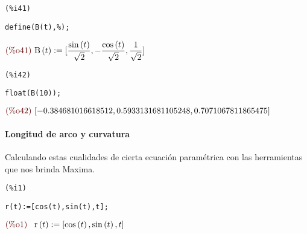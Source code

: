 \documentclass[12pt]{article}
\begin{document}
\noindent
\begin{minipage}[t]{8ex}{\color{red}\bf
\begin{verbatim}
(%i41) 
\end{verbatim}}
\end{minipage}
\begin{minipage}[t]{\textwidth}{\color{blue}
\begin{verbatim}
define(B(t),%);
\end{verbatim}}
\end{minipage}
\begin{math}\displaystyle
\parbox{8ex}{\color{labelcolor}(\%o41) }
\mathrm{B}\left( t\right) :=[\frac{\mathrm{sin}\left( t\right) }{\sqrt{2}},-\frac{\mathrm{cos}\left( t\right) }{\sqrt{2}},\frac{1}{\sqrt{2}}]
\end{math}

\noindent
\begin{minipage}[t]{8ex}{\color{red}\bf
\begin{verbatim}
(%i42) 
\end{verbatim}}
\end{minipage}
\begin{minipage}[t]{\textwidth}{\color{blue}
\begin{verbatim}
float(B(10));
\end{verbatim}}
\end{minipage}
\begin{math}\displaystyle
\parbox{8ex}{\color{labelcolor}(\%o42) }
[-0.384681016618512,0.5933131681105248,0.7071067811865475]
\end{math}

\paragraph{Longitud de arco y curvatura}
Calculando estas cualidades de cierta ecuación paramétrica con las herramientas que nos brinda Maxima.

\noindent
\begin{minipage}[t]{8ex}{\color{red}\bf
\begin{verbatim}
(%i1) 
\end{verbatim}}
\end{minipage}
\begin{minipage}[t]{\textwidth}{\color{blue}
\begin{verbatim}
r(t):=[cos(t),sin(t),t];
\end{verbatim}}
\end{minipage}
\begin{math}\displaystyle
\parbox{8ex}{\color{labelcolor}(\%o1) }
\mathrm{r}\left( t\right) :=[\mathrm{cos}\left( t\right) ,\mathrm{sin}\left( t\right) ,t]
\end{math}
\end{document}
